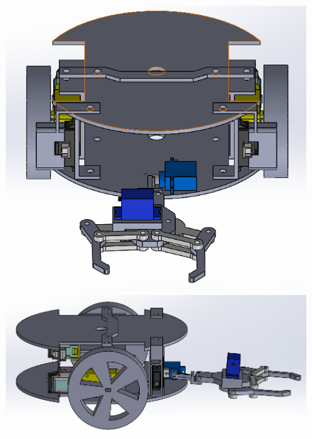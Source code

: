 \documentclass[a4paper,11pt]{article}
\begin{document}
\begin{figure}[H]
    \begin{minipage}[c]{.46\linewidth}
        \centering
        \includegraphics[scale = 0.5]{robot_nu.PNG}
    \end{minipage}
    \hfill
    \begin{minipage}[c]{.46\linewidth}
        \centering
        \includegraphics[scale = 0.46]{robot_nu2.PNG}
    \end{minipage}
\end{figure}
\end{document}
